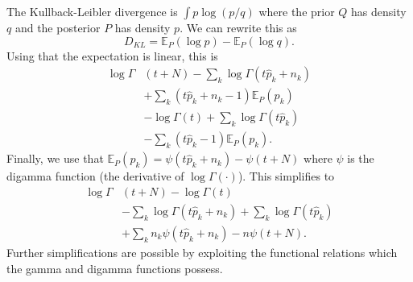 \documentclass[twoside,a4paper,twocolumn,10pt]{article}
\theoremstyle{plain}
\theoremstyle{definition}
\begin{document}
The Kullback-Leibler divergence is $\int p \log(p/q)$ where the prior $Q$ has density $q$
and the posterior $P$ has density $p$.  We can rewrite this as
\[ D_{KL} = \mathbb E_P(\log p) - \mathbb E_P(\log q). \]
Using that the expectation is linear, this is
\begin{align*}
\log\Gamma & (t+N) - \sum_k \log\Gamma(t\hat p_k + n_k) \\
&+ \sum_k (t\hat p_k+n_k-1)\mathbb E_P(p_k) \\
&- \log\Gamma(t) + \sum_k \log\Gamma(t\hat p_k) \\
&- \sum_k (t\hat p_k-1)\mathbb E_P(p_k).
\end{align*}
Finally, we use that $\mathbb E_P(p_k) = \psi(t\hat p_k+n_k) - \psi(t+N)$ where
$\psi$ is the digamma function (the derivative of $\log \Gamma(\cdot)$).  This simplifies to
\begin{align*}
\log\Gamma & (t+N) - \log\Gamma(t) \\
&- \sum_k \log\Gamma(t\hat p_k + n_k)
+ \sum_k \log\Gamma(t\hat p_k) \\
&+ \sum_k n_k\psi(t\hat p_k+n_k) - n\psi(t+N).
\end{align*}
Further simplifications are possible by exploiting the functional relations which the gamma
and digamma functions possess.  
\end{document}

